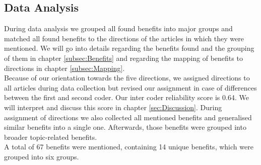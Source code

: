 \subsection{Data Analysis}
During data analysis we grouped all found benefits into major groups and matched all found benefits to the directions of the articles in which they were mentioned. We will go into details regarding the benefits found and the grouping of them in chapter \ref{subsec:Benefits} and regarding the mapping of benefits to directions in chapter \ref{subsec:Mapping}.\\
Because of our orientation towards the five directions, we assigned directions to all articles during data collection but revised our assignment in case of differences between the first and second coder. Our inter coder reliability score is 0.64. We will interpret and discuss this score in chapter \ref{sec:Discussion}. During assignment of directions we also collected all mentioned benefits and generalised similar benefits into a single one. Afterwards, those benefits were grouped into broader topic-related benefits.\\
A total of 67 benefits were mentioned, containing 14 unique benefits, which were grouped into six groups.